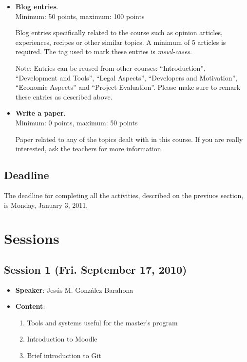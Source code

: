 \documentclass[a4paper]{article}
\begin{document}
\begin{itemize}

\item \textbf{Blog entries}. \\
  Minimum: 50 points, maximum: 100 points

  Blog entries specifically related to the course such as opinion articles, experiences, 
recipes or other similar topics. A minimum of 5 articles is required. The tag used to mark
these entries is \textit{mswl-cases}.

 Note: Entries can be reused from other courses: ``Introduction'', ``Development and Tools'',
``Legal Aspects'', ``Developers and Motivation'', ``Economic Aspects'' and ``Project Evaluation''. 
Please make sure to remark these entries as described above.

\item \textbf{Write a paper}. \\
  Minimum: 0 points, maximum: 50 points

  Paper related to any of the topics dealt with in this course. If you are really interested, ask the teachers for more information.

\end{itemize}

\subsection{Deadline}

The deadline for completing all the activities, described on the previuos section, is Monday, January 3, 2011.

\section{Sessions}

\subsection{Session 1 (Fri. September 17, 2010)}

\begin{itemize}
 \item \textbf{Speaker}: Jesús M. González-Barahona

 \item \textbf{Content}:

  \begin{enumerate}
   \item Tools and systems useful for the master's program
   \item Introduction to Moodle
   \item Brief introduction to Git
  \end{enumerate}

\end{itemize}
\end{document}
